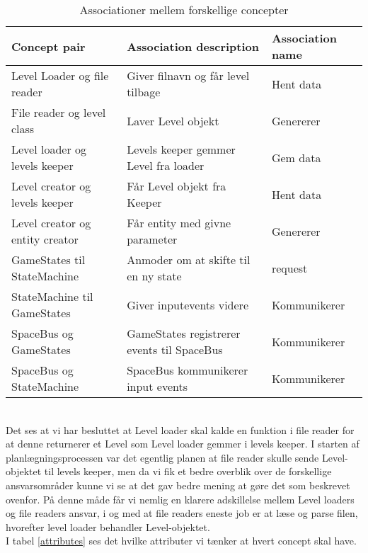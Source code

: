 \begin{table}[!h]
\hspace{-60pt}
\begin{tabular}{|l|l|l|}
\hline
\textbf{Concept pair}           & \textbf{Association description}      & \textbf{Association name} \\ \hline
Level Loader og file reader     & Giver filnavn og får level tilbage    & Hent data                 \\ \hline
File reader og level class      & Laver Level objekt                    & Genererer                 \\ \hline
Level loader og levels keeper   & Levels keeper gemmer Level fra loader & Gem data                  \\ \hline
Level creator og levels keeper  & Får Level objekt fra Keeper           & Hent data                 \\ \hline
Level creator og entity creator & Får entity med givne parameter        & Genererer                 \\ \hline
GameStates til StateMachine & Anmoder om at skifte til en ny state & request \\ \hline
StateMachine til GameStates & Giver inputevents videre & Kommunikerer \\\hline
SpaceBus og GameStates & GameStates registrerer events til SpaceBus & Kommunikerer\\\hline
SpaceBus og StateMachine & SpaceBus kommunikerer input events & Kommunikerer \\\hline
\end{tabular}
\caption{Associationer mellem forskellige concepter}
\label{associations}
\end{table}\\
Det ses at vi har besluttet at Level loader skal kalde en funktion i file reader for at denne returnerer et Level som Level loader gemmer i levels keeper. I starten af planlægningsprocessen var det egentlig planen at file reader skulle sende Level-objektet til levels keeper, men da vi fik et bedre overblik over de forskellige ansvarsområder kunne vi se at det gav bedre mening at gøre det som beskrevet ovenfor. På denne måde får vi nemlig en klarere adskillelse mellem Level loaders og file readers ansvar, i og med at file readers eneste job er at læse og parse filen, hvorefter level loader behandler Level-objektet.\\
I tabel \ref{attributes} ses det hvilke attributer vi tænker at hvert concept skal have.
